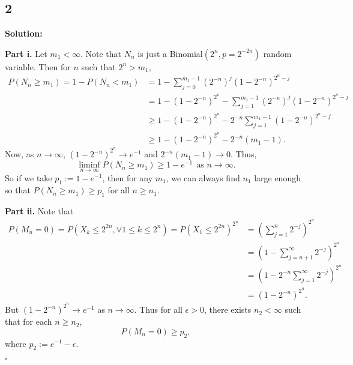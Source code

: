 \documentclass[12pt]{article}
\newcounter{ProofCounter}
\newenvironment{Solution}{\stepcounter{ProofCounter}\textbf{Solution:}}{\hfill$\square$}
\begin{document}

\newpage
\subsection*{2}
\begin{Solution}

  \textbf{Part i.} Let $m_1 < \infty$. Note that $N_n$ is just a Binomial$(2^n, p=2^{-2n})$ random variable. Then for $n$ such that $2^{n} > m_1$,
  \begin{align*}
    P(N_n \geq m_1) = 1 - P(N_n < m_1) & = 1 - \sum_{j=0}^{m_1 - 1}(2^{-n})^j(1 - 2^{-n})^{2^n - j} \\
    & = 1 - (1 - 2^{-n})^{2^n} - \sum_{j=1}^{m_1 - 1}(2^{-n})^j(1 - 2^{-n})^{2^n - j} \\
    & \geq 1 - (1 - 2^{-n})^{2^n} - 2^{-n}\sum_{j=1}^{m_1 - 1}(1 - 2^{-n})^{2^n - j} \\
    & \geq 1 - (1 - 2^{-n})^{2^n} - 2^{-n}(m_1 - 1).
  \end{align*}
  Now, as $n \rightarrow \infty$, $(1 - 2^{-n})^{2^n} \rightarrow e^{-1}$ and $2^{-n}(m_1 - 1) \rightarrow 0$. Thus,
  \[
    \liminf_{n\rightarrow \infty} P(N_n \geq m_1) \geq 1 - e^{-1} \ \ \text{as $n \rightarrow \infty$}.
  \]
  So if we take $p_1 := 1 - e^{-1}$, then for any $m_1$, we can always find $n_1$ large enough so that $P(N_n \geq m_1) \geq p_1$ for all $n \geq n_1$.

  \textbf{Part ii.} Note that
  \begin{align*}
    P(M_n = 0) = P(X_k \leq 2^{2n}, \forall 1 \leq k \leq 2^{n}) = P(X_1 \leq 2^{2n})^{2^n} & = \left( \sum_{j=1}^{n}2^{-j} \right)^{2^n} \\
    & = \left( 1 - \sum_{j=n+1}^{\infty}2^{-j} \right)^{2^n} \\
    & = \left( 1 - 2^{-n}\sum_{j=1}^{\infty} 2^{-j} \right)^{2^{n}} \\
    & = (1 - 2^{-n})^{2^n}.
  \end{align*}
  But $(1 - 2^{-n})^{2^n} \rightarrow e^{-1}$ as $n \rightarrow \infty$. Thus for all $\epsilon > 0$, there exists $n_2 < \infty$ such that for each $n \geq n_2$,
  \[
    P(M_n = 0) \geq p_2,
  \]
  where $p_2 := e^{-1} - \epsilon$.


\end{Solution}
\end{document}
